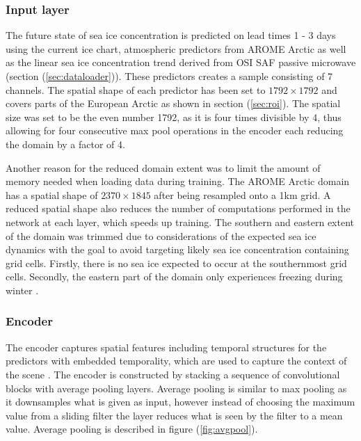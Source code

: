 \documentclass[../main/thesis]{subfiles}
\begin{document}
\subsubsection{Input layer}
The future state of sea ice concentration is predicted on lead times 1 - 3 days using the current ice chart, atmospheric predictors from AROME Arctic as well as the linear sea ice concentration trend derived from OSI SAF passive microwave (section (\ref{sec:dataloader})). These predictors creates a sample consisting of 7 channels. The spatial shape of each predictor has been set to $1792 \times 1792$ and covers parts of the European Arctic as shown in section (\ref{sec:roi}). The spatial size was set to be the even number 1792, as it is four times divisible by 4, thus allowing for four consecutive max pool operations in the encoder \citep{Ronneberger2015} each reducing the domain by a factor of 4. 

Another reason for the reduced domain extent was to limit the amount of memory needed when loading data during training. The AROME Arctic domain has a spatial shape of $2370 \times 1845$ after being resampled onto a 1km grid. A reduced spatial shape also reduces the number of computations performed in the network at each layer, which speeds up training. The southern and eastern extent of the domain was trimmed due to considerations of the expected sea ice dynamics with the goal to avoid targeting likely sea ice concentration containing grid cells. Firstly, there is no sea ice expected to occur at the southernmost grid cells. Secondly, the eastern part of the domain only experiences freezing during winter \citep{Serreze2019}.

\subsubsection{Encoder}
The encoder captures spatial features including temporal structures for the predictors with embedded temporality, which are used to capture the context of the scene \citep{Ronneberger2015}. The encoder is constructed by stacking a sequence of convolutional blocks with average pooling layers. Average pooling is similar to max pooling as it downsamples what is given as input, however instead of choosing the maximum value from a sliding filter the layer reduces what is seen by the filter to a mean value. Average pooling is described in figure (\ref{fig:avgpool}).
\end{document}
